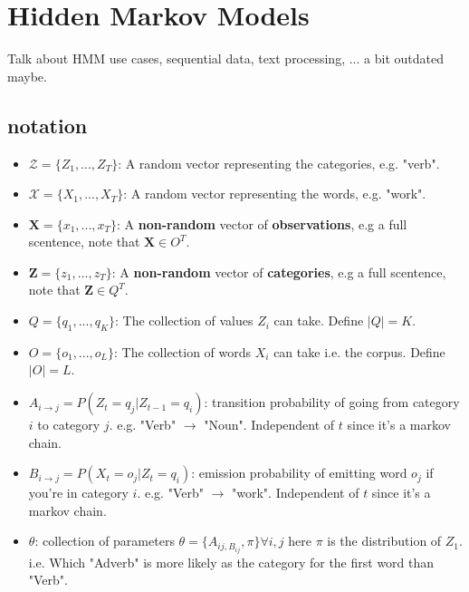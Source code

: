 
\newcommand{\baseFig}{\base/HMM}

\chapter{Hidden Markov Models}

Talk about HMM use cases, sequential data, text processing, ... a bit outdated maybe.

\section{notation}
\begin{itemize}
\item $\mathcal{Z} = \{Z_1, ..., Z_T\}$: A random vector representing the categories, e.g. "verb".

\item $\mathcal{X} = \{X_1, ..., X_T\}$: A random vector representing the words, e.g. "work".

\item $\textbf{X}=\{x_1,...,x_T\}$: A \textbf{non-random} vector of \textbf{observations}, e.g a full scentence, note that $\textbf{X} \in O^T$.
		
\item $\textbf{Z}=\{z_1,...,z_T\}$: A \textbf{non-random} vector of \textbf{categories}, e.g a full scentence, note that $\textbf{Z} \in Q^T$.
		
\item $Q=\{q_1,...,q_K\}$: The collection of values $Z_i$ can take. Define $|Q|=K$.
		
\item $O=\{o_1,...,o_L\}$: The collection of words $X_i$ can take i.e. the corpus. Define $|O|=L$.

\item $A_{i\rightarrow j} = P(Z_t = q_j| Z_{t-1}=q_i)$: transition probability of going from category $i$ to category $j$. e.g. "Verb" $\to$ "Noun". Independent of $t$ since it's a markov chain.
		
\item $B_{i\rightarrow j} = P(X_t = o_j|Z_t = q_i)$: emission probability of emitting word $o_j$ if you're in category $i$. e.g. "Verb" $\to$ "work". Independent of $t$ since it's a markov chain.
		
\item $\theta$: collection of parameters $\theta = \{A_{ij,B_{ij}}, \pi\} \forall i,j$ here $\pi$ is the distribution of $Z_1$. i.e. Which "Adverb" is more likely as the category for the first word than "Verb".

\end{itemize}

